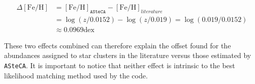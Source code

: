 \documentclass{aa}
\begin{document}
\begin{equation}
\begin{split}
\Delta\mathrm{[Fe/H]} & = \mathrm{[Fe/H]}_{\mathtt{ASteCA}} -
\mathrm{[Fe/H]}_{literature} \\
& = \log(z/0.0152) - \log(z/0.019) = \log(0.019/0.0152) \\
& \approx 0.0969 \mathrm{dex}
\end{split}
\label{eq:delta_feh}
\end{equation}

\noindent These two effects combined can therefore explain the offset found
for the abundances assigned to star clusters in the literature versus those
estimated by \texttt{ASteCA}. It is important to notice that neither effect is
intrinsic to the best likelihood matching method used by the code.
\end{document}
